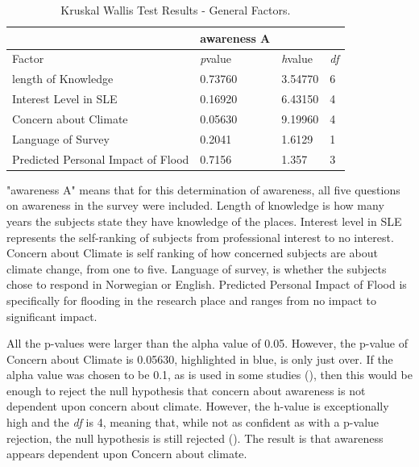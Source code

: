 \begin{table}[H]
    \centering
    \begin{tabular}{|l|l|l|l|}
    \hline
         ~ & \textbf{awareness A} & ~ & ~ \\ \hline
        Factor &\textit{p}value &\textit{h}value & \textit{df} \\ \hline
           length of Knowledge & 0.73760 & 3.54770 & 6 \\ \hline
       Interest Level in SLE & 0.16920 & 6.43150 & 4 \\ \hline
        Concern about Climate & \cellcolor[HTML]{7df9ff} 0.05630 & \cellcolor[HTML]{7df9ff} 9.19960 & \cellcolor[HTML]{7df9ff} 4 \\ \hline
        Language of Survey & 0.2041 & 1.6129 & 1 \\ \hline
        Predicted Personal Impact of Flood & 0.7156 & 1.357 & 3 \\ \hline
    \end{tabular}
    \caption{Kruskal Wallis Test Results - General Factors.}{ "awareness A" means that for this determination of awareness, all five questions on awareness in the survey were included. Length of knowledge is how many years the subjects state they have knowledge of the places. Interest level in SLE represents the self-ranking of subjects from professional interest to no interest. Concern about Climate is self ranking of how concerned subjects are about climate change, from one to five. Language of survey, is whether the subjects chose to respond in Norwegian or English. Predicted Personal Impact of Flood is specifically for flooding in the research place and ranges from no impact to significant impact. }
    \label{kw_test_general_factors}
\end{table}

All the p-values were larger than the alpha value of 0.05. However, the p-value of Concern about Climate is 0.05630, highlighted in blue, is only just over.  If the alpha value was chosen to be 0.1, as is used in some studies (\cite{hollander_nonparametric_2014}), then this would be enough to reject the null hypothesis that concern about awareness is not dependent upon concern about climate. However, the h-value is exceptionally high and the \textit{df} is 4, meaning that, while not as confident as with a p-value rejection, the null hypothesis is still rejected (\cite{minitab_interpret_2022}). The result is that awareness appears dependent upon Concern about climate. 
\paragraph{}


